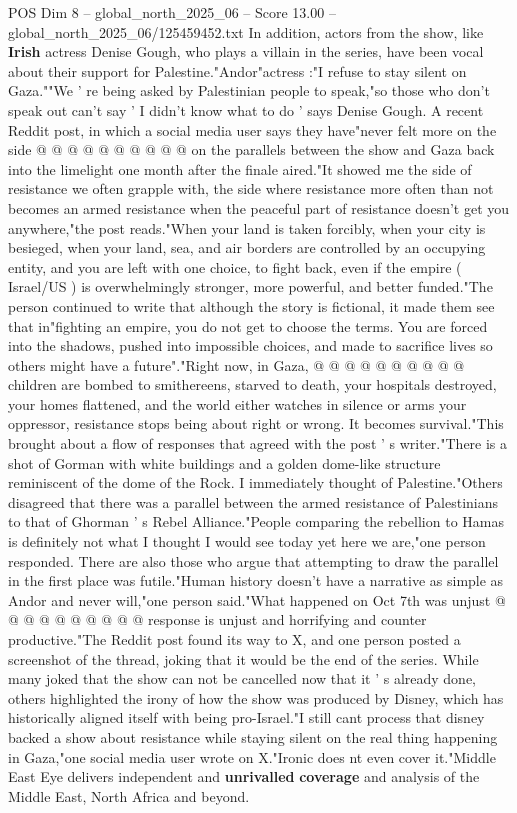 \begin{textsample}{POS Dim 8 – global\_north\_2025\_06 – Score 13.00 – global\_north\_2025\_06/125459452.txt}
In addition, actors from the show, like \textbf{Irish} actress Denise Gough, who plays a villain in the series, have been vocal about their support for Palestine."Andor"actress :"I refuse to stay silent on Gaza.""We ' re being asked by Palestinian people to speak,"so those who don't speak out can't say ' I didn't know what to do ' says Denise Gough.
A recent Reddit post, in which a social media user says they have"never felt more on the side @ @ @ @ @ @ @ @ @ @ on the parallels between the show and Gaza back into the limelight one month after the finale aired."It showed me the side of resistance we often grapple with, the side where resistance more often than not becomes an armed resistance when the peaceful part of resistance doesn't get you anywhere,"the post reads."When your land is taken forcibly, when your city is besieged, when your land, sea, and air borders are controlled by an occupying entity, and you are left with one choice, to fight back, even if the empire ( Israel/US ) is overwhelmingly stronger, more powerful, and better funded."The person continued to write that although the story is fictional, it made them see that in"fighting an empire, you do not get to choose the terms.
You are forced into the shadows, pushed into impossible choices, and made to sacrifice lives so others might have a future"."Right now, in Gaza, @ @ @ @ @ @ @ @ @ @ children are bombed to smithereens, starved to death, your hospitals destroyed, your homes flattened, and the world either watches in silence or arms your oppressor, resistance stops being about right or wrong.
It becomes survival."This brought about a flow of responses that agreed with the post ' s writer."There is a shot of Gorman with white buildings and a golden dome-like structure reminiscent of the dome of the Rock.
I immediately thought of Palestine."Others disagreed that there was a parallel between the armed resistance of Palestinians to that of Ghorman ' s Rebel Alliance."People comparing the rebellion to Hamas is definitely not what I thought I would see today yet here we are,"one person responded.
There are also those who argue that attempting to draw the parallel in the first place was futile."Human history doesn't have a narrative as simple as Andor and never will,"one person said."What happened on Oct 7th was unjust @ @ @ @ @ @ @ @ @ @ response is unjust and horrifying and counter productive."The Reddit post found its way to X, and one person posted a screenshot of the thread, joking that it would be the end of the series.
While many joked that the show can not be cancelled now that it ' s already done, others highlighted the irony of how the show was produced by Disney, which has historically aligned itself with being pro-Israel."I still cant process that disney backed a show about resistance while staying silent on the real thing happening in Gaza,"one social media user wrote on X."Ironic does nt even cover it."Middle East Eye delivers independent and \textbf{unrivalled} \textbf{coverage} and analysis of the Middle East, North Africa and beyond.

\end{textsample}
